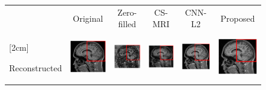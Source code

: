 \documentclass[review]{elsarticle}
\begin{document}
\begin{figure}[H]
	\begin{raggedright}
		\begin{tabular}{>{\centering}b{0.2cm}lcccc}
			& \multicolumn{1}{c}{\footnotesize Original} & {\footnotesize Zero-filled} & {\footnotesize CS-MRI} & {\footnotesize CNN-L2} & {\footnotesize Proposed}\tabularnewline
			\multirow{1}{0.2cm}[2cm]{\begin{turn}{90} {\footnotesize Reconstructed} \end{turn}} &
			 
			 \includegraphics[width=2.5cm]{include/grp2/factor6/022-Guys-0701-T1/022-Guys-0701-T1_images__50} &
			 \includegraphics[width=2.5cm]{include/grp2/factor6/022-Guys-0701-T1/022-Guys-0701-T1_images__zeroPadding_50} & \includegraphics[width=2.5cm]{include/grp2/factor6/022-Guys-0701-T1/022-Guys-0701-T1_images__CS_50} & \includegraphics[width=2.5cm]{include/grp2/factor6/022-Guys-0701-T1/022-Guys-0701-T1_images__CNNL2_50} & \includegraphics[width=2.5cm]{include/grp2/factor6/022-Guys-0701-T1/022-Guys-0701-T1_images__predict_50}
			 
			 \tabularnewline
			 

\end{tabular}
\end{raggedright}
\end{figure}
\end{document}
